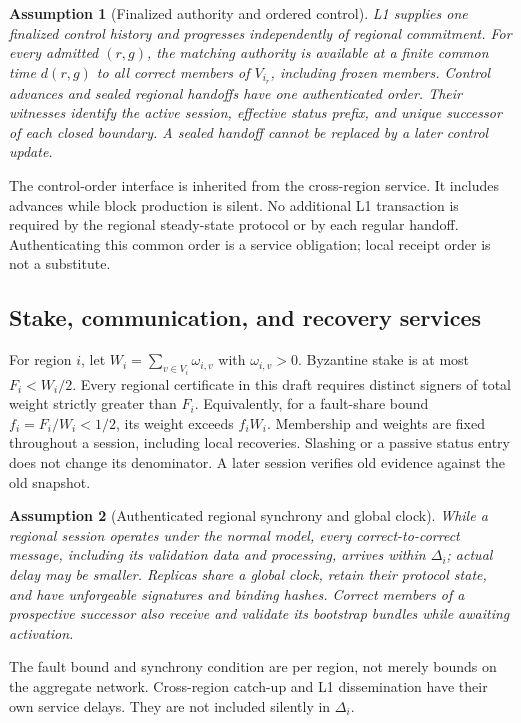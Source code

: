 \documentclass[11pt,a4paper]{article}
\newtheorem{assumption}[assumption]{Assumption}
\newcounter{protocol}
\begin{document}
\begin{assumption}[Finalized authority and ordered control]
\label{ass:authority}
L1 supplies one finalized control history and progresses independently
of regional commitment. For every admitted $(r,g)$, the matching authority
is available at a finite common time $d(r,g)$ to all correct members of
$V_{i_r}$, including frozen members. Control advances and sealed regional
handoffs have one authenticated order. Their witnesses identify the active
session, effective status prefix, and unique successor of each closed
boundary. A sealed handoff cannot be replaced by a later control update.
\end{assumption}
The control-order interface is inherited from the cross-region service.
It includes advances while block production is silent. No additional L1
transaction is required by the regional steady-state protocol or by each
regular handoff. Authenticating this common order is a service obligation;
local receipt order is not a substitute.

\subsection{Stake, communication, and recovery services}
For region $i$, let $W_i=\sum_{v\in V_i}\omega_{i,v}$ with
$\omega_{i,v}>0$. Byzantine stake is at most $F_i<W_i/2$.
Every regional certificate in this draft requires distinct signers of
total weight strictly greater than $F_i$. Equivalently, for a fault-share
bound $f_i=F_i/W_i<1/2$, its weight exceeds $f_iW_i$.
Membership and weights are fixed throughout a session, including local
recoveries. Slashing or a passive status entry does not change its
denominator. A later session verifies old evidence against the old snapshot.

\begin{assumption}[Authenticated regional synchrony and global clock]
\label{ass:network}
While a regional session operates under the normal model, every
correct-to-correct message, including its validation data and processing,
arrives within $\Delta_i$; actual delay may be smaller. Replicas share a
global clock, retain their protocol state, and have unforgeable signatures
and binding hashes. Correct members of a prospective successor also
receive and validate its bootstrap bundles while awaiting activation.
\end{assumption}
The fault bound and synchrony condition are per region, not merely bounds
on the aggregate network. Cross-region catch-up and L1 dissemination have
their own service delays. They are not included silently in $\Delta_i$.
\end{document}
